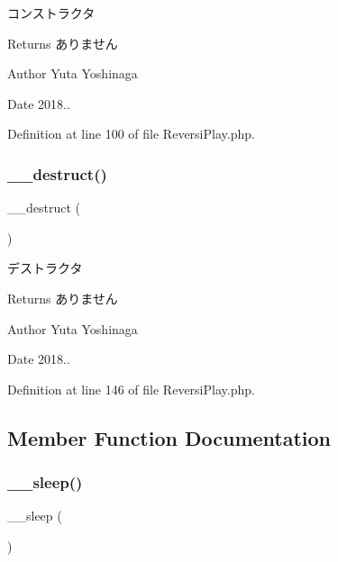 コンストラクタ 

\begin{DoxyReturn}{Returns}
ありません 
\end{DoxyReturn}
\begin{DoxyAuthor}{Author}
Yuta Yoshinaga 
\end{DoxyAuthor}
\begin{DoxyDate}{Date}
2018.. 
\end{DoxyDate}


Definition at line 100 of file Reversi\+Play.\+php.

\mbox{\label{class_reversi_play_a421831a265621325e1fdd19aace0c758}} 
\subsubsection{\texorpdfstring{\+\_\+\+\_\+destruct()}{\_\_destruct()}}
{\footnotesize\ttfamily \+\_\+\+\_\+destruct (\begin{DoxyParamCaption}{ }\end{DoxyParamCaption})}



デストラクタ 

\begin{DoxyReturn}{Returns}
ありません 
\end{DoxyReturn}
\begin{DoxyAuthor}{Author}
Yuta Yoshinaga 
\end{DoxyAuthor}
\begin{DoxyDate}{Date}
2018.. 
\end{DoxyDate}


Definition at line 146 of file Reversi\+Play.\+php.



\subsection{Member Function Documentation}
\mbox{\label{class_reversi_play_aaf11785905da71774e052912d784e3b4}} 
\subsubsection{\texorpdfstring{\+\_\+\+\_\+sleep()}{\_\_sleep()}}
{\footnotesize\ttfamily \+\_\+\+\_\+sleep (\begin{DoxyParamCaption}{ }\end{DoxyParamCaption})}



